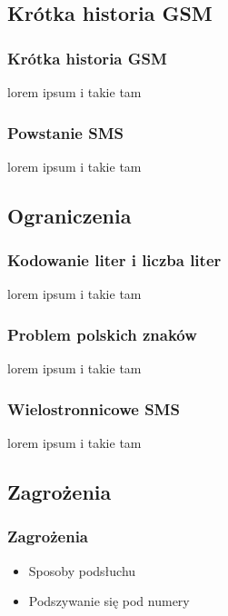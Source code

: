 \documentclass[xcolor=table]{beamer}
\begin{document}
\subsection{Krótka historia GSM}
\begin{frame}
  \frametitle{Krótka historia GSM}

lorem ipsum i takie tam

\end{frame}

\begin{frame}
  \frametitle{Powstanie SMS}

lorem ipsum i takie tam

\end{frame}

\subsection{Ograniczenia}
\begin{frame}
  \frametitle{Kodowanie liter i liczba liter}

lorem ipsum i takie tam

\end{frame}
\begin{frame}
  \frametitle{Problem polskich znaków}

lorem ipsum i takie tam

\end{frame}

\begin{frame}
  \frametitle{Wielostronnicowe SMS}

lorem ipsum i takie tam

\end{frame}

\subsection{Zagrożenia}
\begin{frame}
  \frametitle{Zagrożenia}

\begin{itemize}
\item Sposoby podsłuchu 
\item Podszywanie się pod numery
\end{itemize}

\end{frame}
\end{document}
